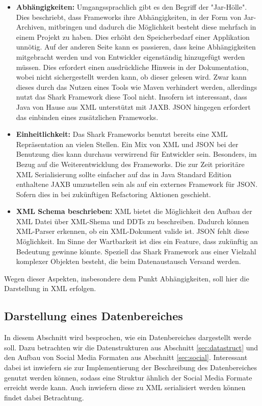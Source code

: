 \documentclass[a4paper]{article}
\begin{document}
	\begin{itemize}
		\item \textbf{Abhängigkeiten:} Umgangssprachlich gibt es den Begriff der
		"Jar-Hölle". Dies beschriebt, dass Frameworks ihre Abhängigkeiten, in der
		Form von Jar-Archiven, mitbringen und dadurch die Möglichkeit besteht diese
		mehrfach in einem Projekt zu haben. Dies erhöht den Speicherbedarf einer
		Applikation unnötig. Auf der anderen Seite kann es passieren, dass keine
		Abhängigkeiten mitgebracht werden und  von Entwickler eigenständig
		hinzugefügt werden müssen. Dies erfordert einen ausdrückliche Hinweis in
		der Dokumentation, wobei nicht sichergestellt werden kann, ob dieser
		gelesen	wird. Zwar kann dieses durch das Nutzen eines Tools wie Maven
		verhindert werden, allerdings nutzt das Shark Framework diese Tool nicht.
		Insofern ist interessant, dass Java von Hause aus XML unterstützt mit JAXB.
		JSON hingegen erfordert das einbinden eines zusätzlichen Frameworks.
		\item \textbf{Einheitlichkeit:} Das Shark Frameworks benutzt bereits eine
		XML Repräsentation an vielen Stellen. Ein Mix von XML und JSON bei der
		Benutzung dies kann durchaus verwirrend für Entwickler sein. Besonders,
		im Bezug auf die Weiterentwicklung des Frameworks. Die zur Zeit prioritäre
		XML Serialisierung sollte einfacher auf das in Java Standard Edition
		enthaltene JAXB umzustellen sein als auf ein externes Framework für JSON.
		Sofern dies in bei zukünftigen Refactoring Aktionen geschieht.
		\item \textbf{XML Schema beschrieben:} XML bietet die Möglichkeit den
		Aufbau der XML Datei über XML-Shema und DDTs zu beschreiben. Dadurch
		können XML-Parser erkennen, ob ein XML-Dokument valide ist. JSON fehlt
		diese Möglichkeit. Im Sinne der Wartbarkeit ist dies ein Feature, dass
		zukünftig an Bedeutung gewinne könnte. Speziell das Shark Framework
		aus einer Vielzahl komplexer Objekten besteht, die beim Datenaustausch
		Versand werden.
	\end{itemize} 	
	
	Wegen dieser Aspekten, insbesondere dem Punkt Abhängigkeiten, soll hier die
	Darstellung in XML erfolgen.
	
	\subsection{Darstellung eines Datenbereiches}
	
	In diesem Abschnitt wird besprochen, wie ein Datenbereiches dargestellt werde
	soll. Dazu betrachten wir die Datenstrukturen aus Abschnitt
	\ref{sec:datastruct} und den Aufbau von Social Media Formaten aus Abschnitt
	\ref{sec:social}. Interessant dabei ist inwiefern sie zur Implementierung der
	Beschreibung des Datenbereiches genutzt werden können, sodass eine Struktur
	ähnlich der Social Media Formate erreicht werde kann. Auch inwiefern
	diese zu XML serialisiert werden können findet dabei Betrachtung.
	
\end{document}
